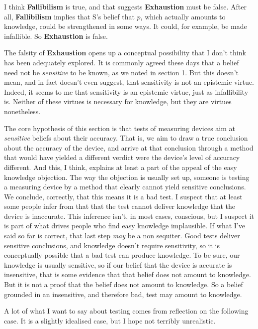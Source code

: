 \noindent I think \textbf{Fallibilism} is true, and that suggests \textbf{Exhaustion} must be false. After all, \textbf{Fallibilism} implies that S's belief that $p$, which actually amounts to knowledge, could be strengthened in some ways. It could, for example, be made infallible. So \textbf{Exhaustion} is false. 

The falsity of \textbf{Exhaustion} opens up a conceptual possibility that I don't think has been adequately explored. It is commonly agreed these days that a belief need not be \textit{sensitive} to be known, as we noted in section 1. But this doesn't mean, and in fact doesn't even suggest, that sensitivity is not an epistemic virtue. Indeed, it seems to me that sensitivity is an epistemic virtue, just as infallibility is. Neither of these virtues is necessary for knowledge, but they are virtues nonetheless.

The core hypothesis of this section is that tests of measuring devices aim at \textit{sensitive} beliefs about their accuracy. That is, we aim to draw a true conclusion about the accuracy of the device, and arrive at that conclusion through a method that would have yielded a different verdict were the device's level of accuracy different. And this, I think, explains at least a part of the appeal of the easy knowledge objection. The way the objection is usually set up, someone is testing a measuring device by a method that clearly cannot yield sensitive conclusions. We conclude, correctly, that this means it is a bad test. I suspect that at least some people infer from that that the test cannot deliver knowledge that the device is inaccurate. This inference isn't, in most cases, conscious, but I suspect it is part of what drives people who find easy knowledge implausible. If what I've said so far is correct, that last step \textit{may} be a non sequiter. Good tests deliver sensitive conclusions, and knowledge doesn't require sensitivity, so it is conceptually possible that a bad test can produce knowledge. To be sure, our knowledge is usually sensitive, so if our belief that the device is accurate is insensitive, that is some evidence that that belief does not amount to knowledge. But it is not a proof that the belief does not amount to knowledge. So a belief grounded in an insensitive, and therefore bad, test may amount to knowledge.

A lot of what I want to say about testing comes from reflection on the following case. It is a slightly idealised case, but I hope not terribly unrealistic.

